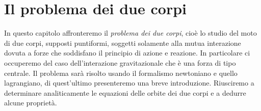 \chapter{Il problema dei due corpi}
\label{chap:due-corpi}

In questo capitolo affronteremo il \emph{problema dei due corpi}, cioè lo studio
del moto di due corpi, supposti puntiformi, soggetti solamente alla mutua
interazione dovuta a forze che soddisfano il principio di azione e reazione. In
particolare ci occuperemo del caso dell'interazione gravitazionale che è una
forza di tipo centrale. Il problema sarà risolto usando il formalismo newtoniano
e quello lagrangiano, di quest'ultimo presenteremo una breve introduzione.
Riusciremo a determinare analiticamente le equazioni delle orbite dei due corpi
e a dedurre alcune proprietà.

